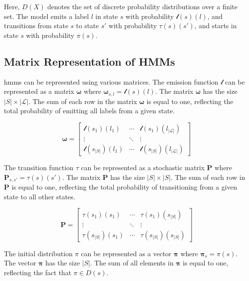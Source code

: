 Here, $D(X)$ denotes the set of discrete probability distributions over a finite set.
The model emits a label $l$ in state $s$ with probability $\mathscr{l}(s)(l)$, and transitions from state $s$ to state $s'$ with probability $\tau(s)(s')$, and starts in state $s$ with probability $\pi(s)$.


\subsection{Matrix Representation of HMMs}\label{subsec:matrix-representation}
\glspl{hmm} can be represented using various matrices.
The emission function $\mathscr{l}$ can be represented as a matrix $\pmb{\omega}$ where $\pmb{\omega}_{s, l} = \mathscr{l}(s)(l)$.
The matrix $\pmb{\omega}$ has the size $|S| \times |\mathcal{L}|$.
The sum of each row in the matrix $\pmb{\omega}$ is equal to one, reflecting the total probability of emitting all labels from a given state.


\[
    \pmb{\omega} = \begin{bmatrix}
                 \mathscr{l}(s_1)(l_1)     & \cdots & \mathscr{l}(s_1)(l_{|\mathcal{L}|})     \\
                 \vdots                    & \ddots & \vdots                                  \\
                 \mathscr{l}(s_{|S|})(l_1) & \cdots & \mathscr{l}(s_{|S|})(l_{|\mathcal{L}|})
    \end{bmatrix}
\]


The transition function $\tau$ can be represented as a stochastic matrix $\pmb{P}$ where $\pmb{P}_{s, s'} = \tau(s)(s')$.
The matrix $\pmb{P}$ has the size $|S| \times |S|$.
The sum of each row in $\pmb{P}$ is equal to one, reflecting the total probability of transitioning from a given state to all other states.

\[
    \pmb{P} = \begin{bmatrix}
            \tau(s_1)(s_1)     & \cdots & \tau(s_1)(s_{|S|})     \\
            \vdots             & \ddots & \vdots                 \\
            \tau(s_{|S|})(s_1) & \cdots & \tau(s_{|S|})(s_{|S|})
    \end{bmatrix}
\]

The initial distribution $\pi$ can be represented as a vector $\pmb{\pi}$ where $\pmb{\pi}_s = \pi(s)$.
The vector $\pmb{\pi}$ has the size $|S|$.
The sum of all elements in $\pmb{\pi}$ is equal to one, reflecting the fact that $\pi \in D(s)$.

